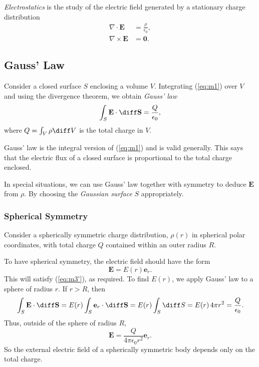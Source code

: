 \documentclass[12pt]{article}
\begin{document}
\emph{Electrostatics} is the study of the electric field generated by a stationary charge distribution
\begin{align*}
	\nabla \cdot \mathbf{E} &= \frac{\rho}{\epsilon_0}, \tag{M1}\label{eq:m1}\\
	\nabla \times \mathbf{E} &= \mathbf{0}. \tag{M3'}\label{eq:m3'}
\end{align*}

\subsection{Gauss' Law}
\label{sub:gauss_law}

Consider a closed surface $S$ enclosing a volume $V$. Integrating (\ref{eq:m1}) over $V$ and using the divergence theorem, we obtain \emph{Gauss' law}
\[
\int_{S} \mathbf{E} \cdot \diff \mathbf{S} = \frac{Q}{\epsilon_0}
,\]
where $Q = \int_{V} \rho \diff V$ is the total charge in $V$.

Gauss' law is the integral version of (\ref{eq:m1}) and is valid generally. This says that the electric flux of a closed surface is proportional to the total charge enclosed.

In special situations, we can use Gauss' law together with symmetry to deduce $\mathbf{E}$ from $\rho$. By choosing the \emph{Gaussian surface} $S$ appropriately.

\subsubsection{Spherical Symmetry}
\label{subsub:spherical_symmetry}

Consider a spherically symmetric charge distribution, $\rho(r)$ in spherical polar coordinates, with total charge $Q$ contained within an outer radius $R$.

To have spherical symmetry, the electric field should have the form
\[
	\mathbf{E} = E(r) \mathbf{e}_r
.\]
This will satisfy (\ref{eq:m3'}), as required. To find $E(r)$, we apply Gauss' law to a sphere of radius $r$. If $r > R$, then
\[
\int_{S}\mathbf{E}\cdot \diff \mathbf{S} = E(r) \int_{S} \mathbf{e}_r \cdot \diff \mathbf{S} = E(r) \int_{S} \diff S = E(r) \, 4 \pi r^2 = \frac{Q}{\epsilon_0}
.\]
Thus, outside of the sphere of radius $R$,
\[
\mathbf{E} = \frac{Q}{4 \pi \epsilon_0 r^2}\mathbf{e}_r
.\]
So the external electric field of a spherically symmetric body depends only on the total charge.
\end{document}
